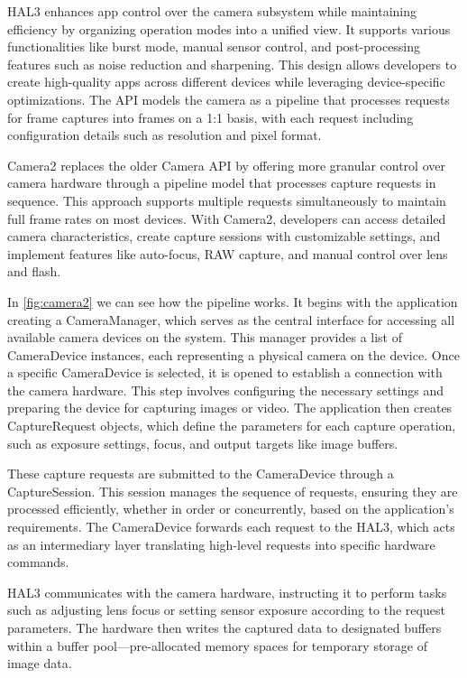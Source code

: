 HAL3 enhances app control over the camera subsystem while maintaining
efficiency by organizing operation modes into a unified view. It supports
various functionalities like burst mode, manual sensor control, and
post-processing features such as noise reduction and sharpening. This design
allows developers to create high-quality apps across different devices while
leveraging device-specific optimizations. The API models the camera as a
pipeline that processes requests for frame captures into frames on a 1:1 basis,
with each request including configuration details such as resolution and pixel
format.

Camera2 replaces the older Camera API by offering more granular control over
camera hardware through a pipeline model that processes capture requests in
sequence. This approach supports multiple requests simultaneously to maintain
full frame rates on most devices. With Camera2, developers can access detailed
camera characteristics, create capture sessions with customizable settings, and
implement features like auto-focus, RAW capture, and manual control over lens
and flash.

In \cref{fig:camera2} we can see how the pipeline works. It begins with the
application creating a CameraManager, which serves as the central interface for
accessing all available camera devices on the system. This manager provides a
list of CameraDevice instances, each representing a physical camera on the
device. Once a specific CameraDevice is selected, it is opened to establish a
connection with the camera hardware. This step involves configuring the
necessary settings and preparing the device for capturing images or video. The
application then creates CaptureRequest objects, which define the parameters
for each capture operation, such as exposure settings, focus, and output
targets like image buffers.

These capture requests are submitted to the CameraDevice through a
CaptureSession. This session manages the sequence of requests, ensuring they
are processed efficiently, whether in order or concurrently, based on the
application's requirements. The CameraDevice forwards each request to the HAL3,
which acts as an intermediary layer translating high-level requests into
specific hardware commands.

HAL3 communicates with the camera hardware, instructing it to perform tasks
such as adjusting lens focus or setting sensor exposure according to the
request parameters. The hardware then writes the captured data to designated
buffers within a buffer pool—pre-allocated memory spaces for temporary storage
of image data.


